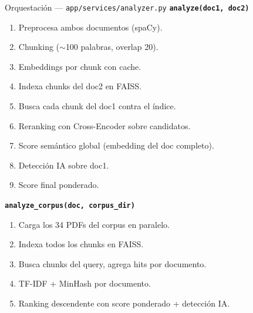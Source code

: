 \documentclass[aspectratio=169]{beamer}
\begin{document}
\begin{frame}{Orquestación — \texttt{app/services/analyzer.py}}
  \textbf{\texttt{analyze(doc1, doc2)}}
  \begin{enumerate}
    \item Preprocesa ambos documentos (spaCy).
    \item Chunking ($\sim$100 palabras, overlap 20).
    \item Embeddings por chunk con cache.
    \item Indexa chunks del doc2 en FAISS.
    \item Busca cada chunk del doc1 contra el índice.
    \item Reranking con Cross-Encoder sobre candidatos.
    \item Score semántico global (embedding del doc completo).
    \item Detección IA sobre doc1.
    \item Score final ponderado.
  \end{enumerate}
  \vspace{0.5em}
  \textbf{\texttt{analyze\_corpus(doc, corpus\_dir)}}
  \begin{enumerate}
    \item Carga los 34 PDFs del corpus en paralelo.
    \item Indexa todos los chunks en FAISS.
    \item Busca chunks del query, agrega hits por documento.
    \item TF-IDF + MinHash por documento.
    \item Ranking descendente con score ponderado + detección IA.
  \end{enumerate}
\end{frame}
\end{document}
